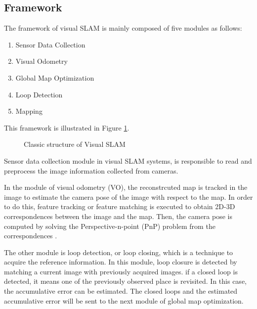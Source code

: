 \subsection{Framework}

The framework of visual SLAM is mainly composed of five modules as follows:
\begin{enumerate}[1.]
	\item Sensor Data Collection
	\item Visual Odometry
	\item Global Map Optimization
	\item Loop Detection
	\item Mapping
\end{enumerate}
 This framework is illustrated in Figure \ref{fig:vslamframe}.

\begin{figure}[!ht]
  \centering
      \caption{Classic structure of Visual SLAM}
      \label{fig:vslamframe}
\end{figure}

Sensor data collection module in visual SLAM systems, is responsible to read and preprocess the image information collected from cameras.

In the module of visual odometry (VO), the reconstrcuted map is tracked in the image to estimate the camera pose of the image with respect to the map. In order to do this, feature tracking or feature matching is executed to obtain 2D-3D correspondences between the image and the map. Then, the camera pose is computed by solving the Perspective-n-point (PnP) problem from the correspondences \cite{klette1998three,nister2007minimal}. 

The other module is loop detection, or loop closing, which is a technique to acquire the reference information. In this module, loop closure is detected by matching a current image with previously acquired images. if a closed loop is detected, it means one of the previously observed place is revisited. In this case, the accumulative error can be estimated. The closed loops and the estimated accumulative error will be sent to the next module of global map optimization.

